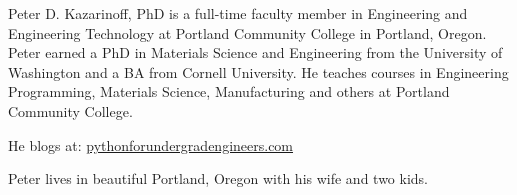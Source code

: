 \documentclass{book}
\begin{document}
    
        Peter D. Kazarinoff, PhD is a full-time faculty member in Engineering
and Engineering Technology at Portland Community College in Portland,
Oregon. Peter earned a PhD in Materials Science and Engineering from the
University of Washington and a BA from Cornell University. He teaches
courses in Engineering Programming, Materials Science, Manufacturing and
others at Portland Community College.

He blogs at:
\href{https://pythonforundergradengineers.com/}{pythonforundergradengineers.com}

Peter lives in beautiful Portland, Oregon with his wife and two kids.
    




    
    
    
    
\end{document}
